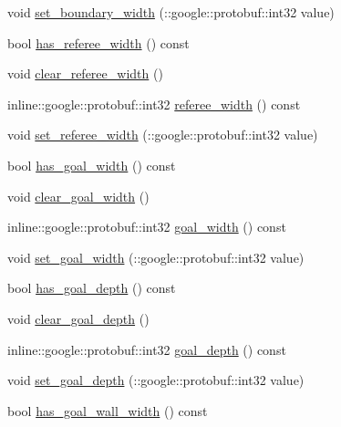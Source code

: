 \begin{DoxyCompactItemize}
\item 
void \hyperlink{class_s_s_l___geometry_field_size_ab2d79bf4867ff61e25667312dd94eb51}{set\-\_\-boundary\-\_\-width} (\-::google\-::protobuf\-::int32 value)
\item 
bool \hyperlink{class_s_s_l___geometry_field_size_aef2beca1b9e1f8faec3f12d49e57ae52}{has\-\_\-referee\-\_\-width} () const 
\item 
void \hyperlink{class_s_s_l___geometry_field_size_aac7b108510c132021f5f1e762da0132f}{clear\-\_\-referee\-\_\-width} ()
\item 
inline\-::google\-::protobuf\-::int32 \hyperlink{class_s_s_l___geometry_field_size_ade357b5bebdf6d62b7d5160faa9ec874}{referee\-\_\-width} () const 
\item 
void \hyperlink{class_s_s_l___geometry_field_size_a21758f51a1245c9b1134654f96f0e4b0}{set\-\_\-referee\-\_\-width} (\-::google\-::protobuf\-::int32 value)
\item 
bool \hyperlink{class_s_s_l___geometry_field_size_a6a37074c15b1d85428faa03e8958f1d6}{has\-\_\-goal\-\_\-width} () const 
\item 
void \hyperlink{class_s_s_l___geometry_field_size_af87a90862981c0c83d59c8f466f64c49}{clear\-\_\-goal\-\_\-width} ()
\item 
inline\-::google\-::protobuf\-::int32 \hyperlink{class_s_s_l___geometry_field_size_a9c75eced918a84795e1c198864df48e0}{goal\-\_\-width} () const 
\item 
void \hyperlink{class_s_s_l___geometry_field_size_ad14d7b0b6489efc79506835efd4b1113}{set\-\_\-goal\-\_\-width} (\-::google\-::protobuf\-::int32 value)
\item 
bool \hyperlink{class_s_s_l___geometry_field_size_addd03de17523aee6653684967b3756f3}{has\-\_\-goal\-\_\-depth} () const 
\item 
void \hyperlink{class_s_s_l___geometry_field_size_a8e900bacf1cc5c7c0d2a4a68e70089cb}{clear\-\_\-goal\-\_\-depth} ()
\item 
inline\-::google\-::protobuf\-::int32 \hyperlink{class_s_s_l___geometry_field_size_a73a022eff1c4a6f53f7de9614aef0508}{goal\-\_\-depth} () const 
\item 
void \hyperlink{class_s_s_l___geometry_field_size_a38910927a3589c816880b8451c34abd4}{set\-\_\-goal\-\_\-depth} (\-::google\-::protobuf\-::int32 value)
\item 
bool \hyperlink{class_s_s_l___geometry_field_size_ade9aff63dea174d98fea471e76367421}{has\-\_\-goal\-\_\-wall\-\_\-width} () const 
\item 

\end{DoxyCompactItemize}
